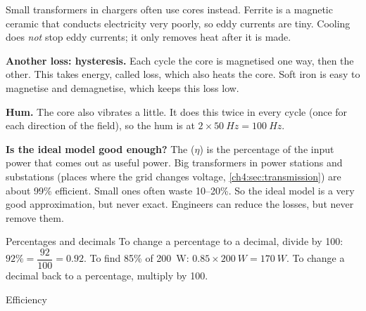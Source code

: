 Small transformers in chargers often use  cores instead. Ferrite is a
magnetic ceramic that conducts electricity very poorly, so eddy currents are tiny.
Cooling does \emph{not} stop eddy currents; it only removes heat after it is made.

\textbf{Another loss: hysteresis.} Each cycle the core is magnetised one way, then the
other. This takes energy, called  loss, which also heats the core. Soft
iron is easy to magnetise and demagnetise, which keeps this loss low.

\textbf{Hum.} The core also vibrates a little. It does this twice in every cycle (once for
each direction of the field), so the hum is at $2 \times \qty{50}{Hz} = \qty{100}{Hz}$.

\textbf{Is the ideal model good enough?} The  ($\eta$) is the percentage
of the input power that comes out as useful power. Big transformers in power stations
and substations (places where the grid changes voltage, \cref{ch4:sec:transmission}) are
about 99\% efficient. Small ones often waste 10--20\%. So the ideal model is a very good
approximation, but never exact. Engineers can reduce the losses, but never remove them.

\begin{toolkit}{Percentages and decimals}
To change a percentage to a decimal, divide by 100: $92\% = \dfrac{92}{100} = 0.92$. To
find 85\% of \qty{200}{W}: $0.85 \times \qty{200}{W} = \qty{170}{W}$. To change a decimal
back to a percentage, multiply by 100.
\end{toolkit}

\begin{formulacard}[notonsheet]{Efficiency}
  \begin{symbols}
  \end{symbols}
\end{formulacard}

